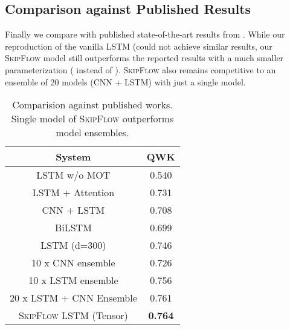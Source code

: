 \documentclass[letterpaper]{article}
\begin{document}
\subsection{Comparison against Published Results}
Finally we compare with published state-of-the-art results from \cite{DBLP:conf/emnlp/TaghipourN16}. While our reproduction of the vanilla LSTM (could not achieve similar results, our \textsc{SkipFlow} model still outperforms the reported results with a much smaller parameterization ( instead of ). \textsc{SkipFlow} also remains competitive to an ensemble of 20 models (CNN + LSTM) with just a single model. 

\begin{table}[htbp]
  \centering
  \small
    \begin{tabular}{|c|c|}
    \hline
    System &  QWK \\
    \hline
    
    LSTM w/o MOT & 0.540 \\
    LSTM + Attention & 0.731 \\
    CNN + LSTM &0.708 \\
    BiLSTM &  0.699 \\
    LSTM (d=300) & 0.746 \\
     10 x CNN ensemble  & 0.726 \\
    10 x LSTM ensemble   & 0.756 \\
    20 x LSTM + CNN Ensemble & 0.761 \\
    \hline
    \textsc{SkipFlow} LSTM (Tensor) &   \textbf{0.764} \\
   \hline
    
    \end{tabular}\caption{Comparision against published works. Single model of \textsc{SkipFlow} outperforms model ensembles.}
    \label{tab:pub_compare}
    \end{table}
\end{document}
